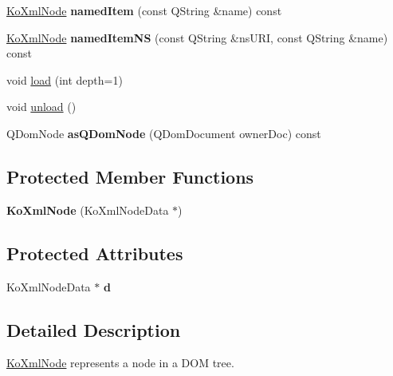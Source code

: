 \begin{CompactItemize}
\item 
\hypertarget{classKoXmlNode_3c1e84615051a447ad66de67b4cb3b51}{
\hyperlink{classKoXmlNode}{KoXmlNode} \textbf{namedItem} (const QString \&name) const }
\label{classKoXmlNode_3c1e84615051a447ad66de67b4cb3b51}

\item 
\hypertarget{classKoXmlNode_875cc1bd632bdce741ef0e64c2e8e348}{
\hyperlink{classKoXmlNode}{KoXmlNode} \textbf{namedItemNS} (const QString \&nsURI, const QString \&name) const }
\label{classKoXmlNode_875cc1bd632bdce741ef0e64c2e8e348}

\item 
void \hyperlink{classKoXmlNode_00f067df3c054abdb722f3cdf372f58f}{load} (int depth=1)
\item 
void \hyperlink{classKoXmlNode_6db615544f532dec26530d2fe413c946}{unload} ()
\item 
\hypertarget{classKoXmlNode_cc8aa6574d8389e8ba9e1bc758d1038d}{
QDomNode \textbf{asQDomNode} (QDomDocument ownerDoc) const }
\label{classKoXmlNode_cc8aa6574d8389e8ba9e1bc758d1038d}

\end{CompactItemize}
\subsection*{Protected Member Functions}
\begin{CompactItemize}
\item 
\hypertarget{classKoXmlNode_150c3bcb9ccb9978784733a72fc56230}{
\textbf{KoXmlNode} (KoXmlNodeData $\ast$)}
\label{classKoXmlNode_150c3bcb9ccb9978784733a72fc56230}

\end{CompactItemize}
\subsection*{Protected Attributes}
\begin{CompactItemize}
\item 
\hypertarget{classKoXmlNode_09a35b2e854d2bca37c7c43aa89fa4e5}{
KoXmlNodeData $\ast$ \textbf{d}}
\label{classKoXmlNode_09a35b2e854d2bca37c7c43aa89fa4e5}

\end{CompactItemize}


\subsection{Detailed Description}
\hyperlink{classKoXmlNode}{KoXmlNode} represents a node in a DOM tree.

